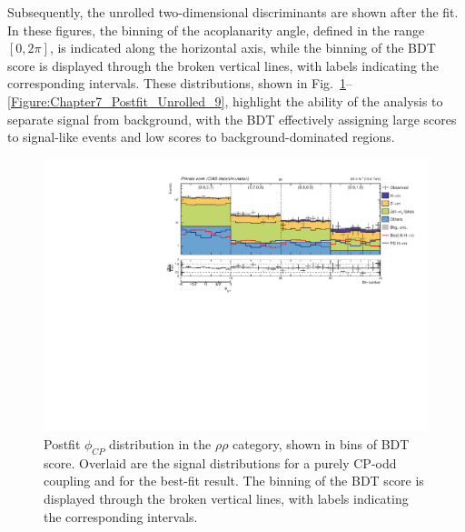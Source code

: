 Subsequently, the unrolled two-dimensional discriminants are shown after the fit. In these figures, the binning of the acoplanarity angle, defined in the range $[0,2\pi]$, is indicated along the horizontal axis, while the binning of the BDT score is displayed through the broken vertical lines, with labels indicating the corresponding intervals. These distributions, shown in Fig.~\ref{Figure:Chapter7_Postfit_Unrolled_1}--\ref{Figure:Chapter7_Postfit_Unrolled_9}, highlight the ability of the analysis to separate signal from background, with the \ac{BDT} effectively assigning large scores to signal-like events and low scores to background-dominated regions.

\begin{figure}[!htbp]
    \centering
    \includegraphics[width=1\textwidth]{Figures/Chapter7/postfit/htt_tt_3_13p6TeV.pdf}
    \caption[Postfit $\phi_{CP}$ distribution in the $\rho\rho$ category.]
    {Postfit $\phi_{CP}$ distribution in the $\rho\rho$ category, shown in bins of \ac{BDT} score. Overlaid are the signal distributions for a purely CP-odd coupling and for the best-fit result. The binning of the BDT score is displayed through the broken vertical lines, with labels indicating the corresponding intervals.}
    \label{Figure:Chapter7_Postfit_Unrolled_1}
\end{figure}


